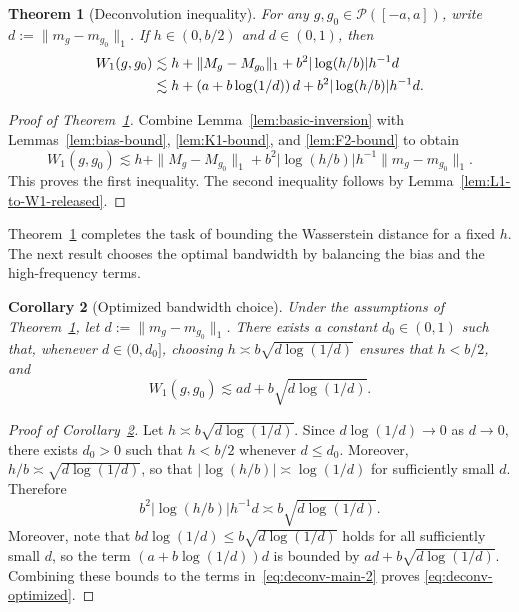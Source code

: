 \documentclass[english, 11pt]{article}
\theoremstyle{plain}
\newtheorem{theorem}{Theorem}[section]
\newtheorem{corollary}[theorem]{Corollary}
\theoremstyle{definition}
\theoremstyle{remark}
\begin{document}
\begin{theorem}[Deconvolution inequality]\label{thm:deconv-main}
For any $g,g_0\in\mathcal P([-a,a])$, write $d:=\|m_g-m_{g_0}\|_1$.
If $h\in(0,b/2)$ and $d\in(0,1)$, then
\begin{align}
W_1(g,g_0)&\lesssim h + \|M_g-M_{g_0}\|_1 + b^2 |\log(h/b)| h^{-1} d \notag\\
&\lesssim h + \left(a+b\log(1/d)\right)d + b^2 |\log(h/b)| h^{-1}d.
\label{eq:deconv-main-2}
\end{align}
\end{theorem}

\begin{proof}[Proof of Theorem~\ref{thm:deconv-main}]
Combine Lemma~\ref{lem:basic-inversion} with Lemmas~\ref{lem:bias-bound}, \ref{lem:K1-bound}, and \ref{lem:F2-bound} to obtain
\begin{equation*}
W_1(g,g_0) \lesssim h + \|M_g-M_{g_0}\|_1 + b^2 |\log(h/b)| h^{-1} \|m_g-m_{g_0}\|_1.
\end{equation*}
This proves the first inequality. The second inequality follows by Lemma~\ref{lem:L1-to-W1-released}.
\end{proof}

Theorem~\ref{thm:deconv-main} completes the task of bounding the Wasserstein distance for a fixed $h$.
The next result chooses the optimal bandwidth by balancing the bias and the high-frequency terms.

\begin{corollary}[Optimized bandwidth choice]\label{cor:deconv-optimized}
Under the assumptions of Theorem~\ref{thm:deconv-main}, let $d:=\|m_g-m_{g_0}\|_1$.
There exists a constant $d_0\in(0,1)$ such that, whenever $d\in(0,d_0]$, choosing $h \asymp b\sqrt{d\log(1/d)}$ ensures that $h<b/2$, and
\begin{equation}\label{eq:deconv-optimized}
W_1(g,g_0) \lesssim ad + b\sqrt{d\log(1/d)}.
\end{equation}
\end{corollary}

\begin{proof}[Proof of Corollary~\ref{cor:deconv-optimized}]
Let $h \asymp b\sqrt{d\log(1/d)}$. Since $d\log(1/d) \rightarrow 0$ as $d \rightarrow 0$, there exists $d_0 >0$ such that $h<b/2$ whenever $d \le d_0$.
Moreover, $h/b \asymp \sqrt{d\log(1/d)}$, so that
$|\log(h/b)|\asymp \log(1/d)$
for sufficiently small $d$. Therefore
\begin{equation*}
b^2 |\log(h/b)| h^{-1} d \asymp b \sqrt{d \log(1 / d)}.
\end{equation*}
Moreover, note that $bd\log(1/d)\le b\sqrt{d\log(1/d)}$ holds for all sufficiently small $d$, so the term $\left(a+b\log(1/d)\right)d$ is bounded by $ad + b\sqrt{d\log(1/d)}$.
Combining these bounds to the terms in~\eqref{eq:deconv-main-2} proves \eqref{eq:deconv-optimized}.
\end{proof}
\end{document}
